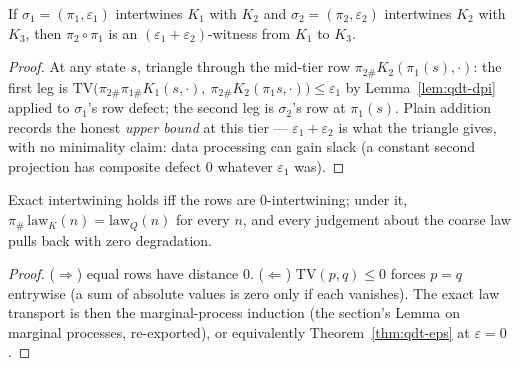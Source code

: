 \begin{bprop}\label{prop:qdt-comp}
If $\sigma_1 = (\pi_1, \varepsilon_1)$ intertwines $K_1$ with $K_2$ and
$\sigma_2 = (\pi_2, \varepsilon_2)$ intertwines $K_2$ with $K_3$, then
$\pi_2 \circ \pi_1$ is an $(\varepsilon_1 + \varepsilon_2)$-witness
from $K_1$ to $K_3$.
\end{bprop}
\begin{proof}
At any state $s$, triangle through the mid-tier row
$\pi_{2\#} K_2(\pi_1(s), \cdot)$: the first leg is
$\mathrm{TV}\bigl(\pi_{2\#}\pi_{1\#}K_1(s,\cdot),\
\pi_{2\#}K_2(\pi_1 s, \cdot)\bigr) \leq \varepsilon_1$ by
Lemma~\ref{lem:qdt-dpi} applied to $\sigma_1$'s row defect; the second
leg is $\sigma_2$'s row at $\pi_1(s)$. Plain addition records the honest
\emph{upper bound} at this tier --- $\varepsilon_1 + \varepsilon_2$ is
what the triangle gives, with no minimality claim: data processing can
gain slack (a constant second projection has composite defect $0$
whatever $\varepsilon_1$ was).
\end{proof}

\begin{bprop}[the strict column is the $\varepsilon = 0$ instantiation]
\label{prop:qdt-strict}
Exact intertwining holds iff the rows are $0$-intertwining; under it,
$\pi_{\#}\,\mathrm{law}_K(n) = \mathrm{law}_Q(n)$ for every $n$, and
every judgement about the coarse law pulls back with zero degradation.
\end{bprop}
\begin{proof}
($\Rightarrow$) equal rows have distance $0$. ($\Leftarrow$)
$\mathrm{TV}(p, q) \leq 0$ forces $p = q$ entrywise (a sum of absolute
values is zero only if each vanishes). The exact law transport is then
the marginal-process induction (the \rulename{QCoupleDrift} section's
Lemma on marginal processes, re-exported), or equivalently
Theorem~\ref{thm:qdt-eps} at $\varepsilon = 0$.
\end{proof}

